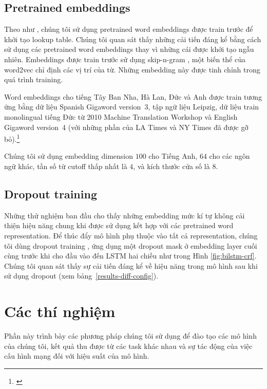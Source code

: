 \documentclass[11pt,letterpaper]{article}
\begin{document}
\subsection{Pretrained embeddings}\label{sec:pretrained}

Theo như , chúng tôi sử dụng pretrained word embeddings được train trước để khởi tạo lookup table. Chúng tôi quan sát thấy những cải tiến đáng kể bằng cách sử dụng các pretrained word embeddings thay vì những cái được khởi tạo ngẫu nhiên. Embeddings được train trước sử dụng skip-n-gram \cite{skipngram}, một biến thể của word2vec \cite{mikolov2013efficient} chỉ định các vị trí của từ. Những embedding này được tinh chỉnh trong quá trình training.

Word embeddings cho tiếng Tây Ban Nha, Hà Lan, Đức và Anh được train tương ứng bằng dữ liệu Spanish Gigaword version~3, tập ngữ liệu Leipzig, dữ liệu train monolingual tiếng Đức từ 2010 Machine Translation Workshop và English Gigaword version~4 (với những phần của LA Times và NY Times đã được gỡ bỏ).\footnote{\cite{graff2011spanish,biemann2007leipzig,callison2010findings,englishgigaword}}

Chúng tôi sử dụng embedding dimension $100$ cho Tiếng Anh, $64$ cho các ngôn ngữ khác, tần số từ cutoff thấp nhất là $4$, và kích thước cửa số là $8$.

\subsection{Dropout training}\label{sec:dropout}

Những thử nghiệm ban đầu cho thấy những embedding mức kí tự không cải thiện hiệu năng chung khi được sử dụng kết hợp với các pretrained word representation. Để thúc đẩy mô hình phụ thuộc vào tất cả representation, chúng tôi dùng dropout training \cite{dropout}, ứng dụng một dropout mask ở embedding layer cuối cùng trước khi cho đầu vào đến LSTM hai chiều như trong Hình \ref{fig:bilstm-crf}. Chúng tôi quan sát thấy sự cải tiến đáng kể về hiệu năng trong mô hình sau khi sử dụng dropout (xem bảng~\ref{results-diff-config}).

\section{Các thí nghiệm}\label{sec:experiments}

Phần này trình bày các phương pháp chúng tôi sử dụng để đào tạo các mô hình của chúng tôi, kết quả thu được từ các task khác nhau và sự tác động của việc cấu hình mạng đối với hiệu suất của mô hình.
\end{document}
